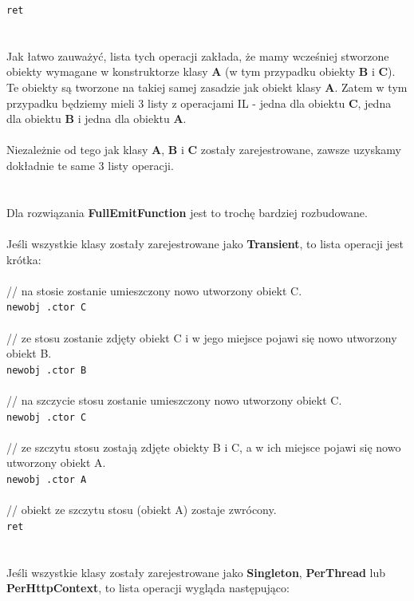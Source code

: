 \documentclass[12pt]{article}
\begin{document}
\texttt{ret} \\
\\
\\
Jak łatwo zauważyć, lista tych operacji zakłada, że mamy wcześniej stworzone obiekty wymagane w konstruktorze klasy \textbf{A} (w tym przypadku obiekty \textbf{B} i \textbf{C}). Te obiekty są tworzone na takiej samej zasadzie jak obiekt klasy \textbf{A}. Zatem w tym przypadku będziemy mieli 3 listy z operacjami IL - jedna dla obiektu \textbf{C}, jedna dla obiektu \textbf{B} i jedna dla obiektu \textbf{A}.\\
\\
Niezależnie od tego jak klasy \textbf{A}, \textbf{B} i \textbf{C} zostały zarejestrowane, zawsze uzyskamy dokładnie te same 3 listy operacji.\\
\\
\\
Dla rozwiązania \textbf{FullEmitFunction} jest to trochę bardziej rozbudowane.\\
\\
Jeśli wszystkie klasy zostały zarejestrowane jako \textbf{Transient}, to lista operacji jest krótka:\\
\\ 
// na stosie zostanie umieszczony nowo utworzony obiekt C.\\
\texttt{newobj .ctor C}\\
\\
\newpage
// ze stosu zostanie zdjęty obiekt C i w jego miejsce pojawi się nowo utworzony obiekt B.\\
\texttt{newobj .ctor B}\\
\\ 
// na szczycie stosu zostanie umieszczony nowo utworzony obiekt C.\\
\texttt{newobj .ctor C}\\
\\
// ze szczytu stosu zostają zdjęte obiekty B i C, a w ich miejsce pojawi się nowo utworzony obiekt A.\\
\texttt{newobj .ctor A}\\
\\
// obiekt ze szczytu stosu (obiekt A) zostaje zwrócony.\\
\texttt{ret}\\
\\
\\
Jeśli wszystkie klasy zostały zarejestrowane jako \textbf{Singleton}, \textbf{PerThread} lub \textbf{PerHttpContext}, to lista operacji wygląda następująco:\\
\end{document}
